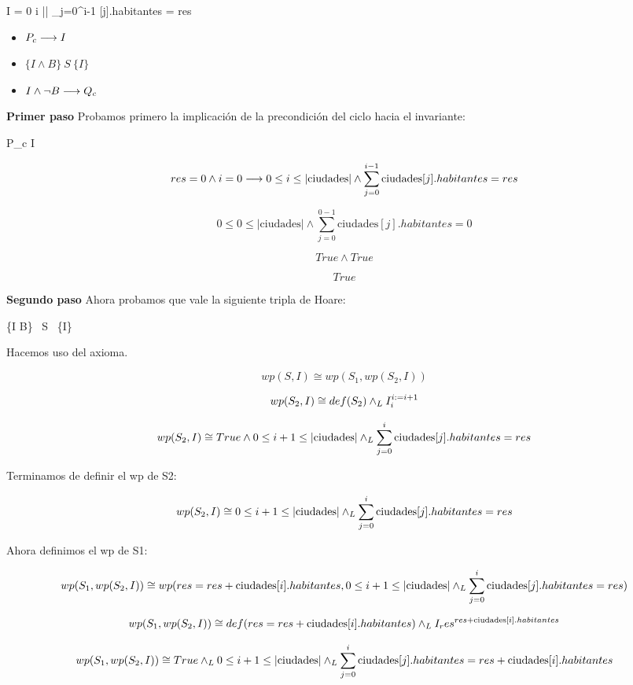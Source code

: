 \documentclass[10pt,a4paper]{article}
\begin{document}
I = 0 \leq i \leq || \land \sum_{j=0}^{i-1} [j].habitantes = res

\begin{itemize}
    \item \( P_c \longrightarrow I \)
    \item \( \{I \land B\} \ S \ \{I\} \)
    \item \( I \land \neg B \longrightarrow Q_c \)
\end{itemize}

\textbf{Primer paso} Probamos primero la implicación de la precondición del ciclo hacia el invariante:

P_c \implica I

\[
res = 0 \land i = 0 \longrightarrow 0 \leq i \leq |\text{ciudades}| \land \sum_{j=0}^{i-1} \text{ciudades}[j].habitantes = res
\]

\[
 0 \leq 0 \leq |\text{ciudades}| \land \sum_{j=0}^{0-1} \text{ciudades}[j].habitantes = 0
\]

\[
True \land True
\]

\[
True
\]

\textbf{Segundo paso} Ahora probamos que vale la siguiente tripla de Hoare:

\{I \land B\} \ S \ \{I\}

Hacemos uso del axioma.

\[
wp(S, I) \cong wp(S_1, wp(S_2, I))
\]

\[
wp(S_2, I) \cong def(S_2) \land _L I_i^{i := i+1}
\]

\[
wp(S_2, I) \cong True \land 0 \leq i+1 \leq |\text{ciudades}| \land _L \sum_{j=0}^{i} \text{ciudades}[j].habitantes = res
\]

Terminamos de definir el wp de S2:

\[
wp(S_2, I) \cong 0 \leq i+1 \leq |\text{ciudades}| \land _L \sum_{j=0}^{i} \text{ciudades}[j].habitantes = res
\]

Ahora definimos el wp de S1:

\[
wp(S_1, wp(S_2, I)) \cong wp(res = res + \text{ciudades}[i].habitantes, 0 \leq i+1 \leq |\text{ciudades}| \land _L \sum_{j=0}^{i} \text{ciudades}[j].habitantes = res)
\]

\[
wp(S_1, wp(S_2, I)) \cong def(res = res + \text{ciudades}[i].habitantes) \land _L I_res^{res + \text{ciudades}[i].habitantes}
\]

\[
wp(S_1, wp(S_2, I)) \cong True \land _L 0 \leq i+1 \leq |\text{ciudades}| \land _L \sum_{j=0}^{i} \text{ciudades}[j].habitantes = res + \text{ciudades}[i].habitantes
\]
\end{document}
